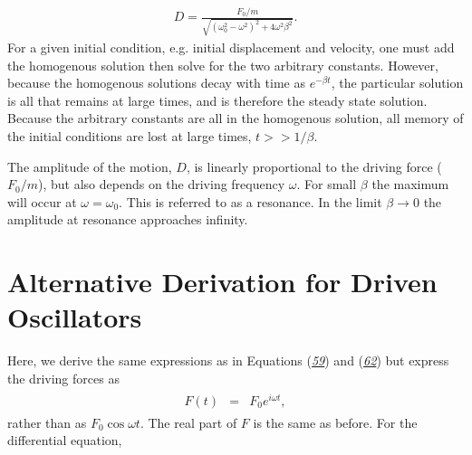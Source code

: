 \documentclass[letterpaper,10pt,english]{sphinxmanual}
\begin{document}
\begin{equation*}
\begin{split}
\begin{equation}
\label{eq:Ddrive} \tag{62}
D=\frac{F_0/m}{\sqrt{(\omega_0^2-\omega^2)^2+4\omega^2\beta^2}}.
\end{equation}
\end{split}
\end{equation*}
For a given initial condition, e.g. initial displacement and velocity,
one must add the homogenous solution then solve for the two arbitrary
constants. However, because the homogenous solutions decay with time
as \(e^{-\beta t}\), the particular solution is all that remains at
large times, and is therefore the steady state solution. Because the
arbitrary constants are all in the homogenous solution, all memory of
the initial conditions are lost at large times, \(t>>1/\beta\).

The amplitude of the motion, \(D\), is linearly proportional to the
driving force (\(F_0/m\)), but also depends on the driving frequency
\(\omega\). For small \(\beta\) the maximum will occur at
\(\omega=\omega_0\). This is referred to as a resonance. In the limit
\(\beta\rightarrow 0\) the amplitude at resonance approaches infinity.


\section{Alternative Derivation for Driven Oscillators}
\label{\detokenize{chapter1:alternative-derivation-for-driven-oscillators}}
Here, we derive the same expressions as in Equations ({\hyperref[\detokenize{chapter1:eq:partform}]{\emph{59}}}) and ({\hyperref[\detokenize{chapter1:eq:Ddrive}]{\emph{62}}}) but express the driving forces as
\begin{equation*}
\begin{split}
\begin{eqnarray}
F(t)&=&F_0e^{i\omega t},
\end{eqnarray}
\end{split}
\end{equation*}
rather than as \(F_0\cos\omega t\). The real part of \(F\) is the same as before. For the differential equation,
\end{document}
